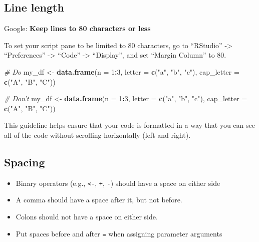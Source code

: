 \documentclass[]{book}
\makeatletter
\newenvironment{Shaded}{\begin{snugshade}}{\end{snugshade}}
\newcommand{\KeywordTok}[1]{\textcolor[rgb]{0.13,0.29,0.53}{\textbf{#1}}}
\newcommand{\DataTypeTok}[1]{\textcolor[rgb]{0.13,0.29,0.53}{#1}}
\newcommand{\DecValTok}[1]{\textcolor[rgb]{0.00,0.00,0.81}{#1}}
\newcommand{\StringTok}[1]{\textcolor[rgb]{0.31,0.60,0.02}{#1}}
\newcommand{\CommentTok}[1]{\textcolor[rgb]{0.56,0.35,0.01}{\textit{#1}}}
\newcommand{\OperatorTok}[1]{\textcolor[rgb]{0.81,0.36,0.00}{\textbf{#1}}}
\newcommand{\NormalTok}[1]{#1}
\providecommand{\tightlist}{%
  \setlength{\itemsep}{0pt}\setlength{\parskip}{0pt}}
\newenvironment{kframe}{%
\medskip{}
\setlength{\fboxsep}{.8em}
 \def\at@end@of@kframe{}%
 \ifinner\ifhmode%
  \def\at@end@of@kframe{\end{minipage}}%
  \begin{minipage}{\columnwidth}%
 \fi\fi%
 \def\FrameCommand##1{\hskip\@totalleftmargin \hskip-\fboxsep
 \colorbox{shadecolor}{##1}\hskip-\fboxsep
     \hskip-\linewidth \hskip-\@totalleftmargin \hskip\columnwidth}%
 \MakeFramed {\advance\hsize-\width
   \@totalleftmargin\z@ \linewidth\hsize
   \@setminipage}}%
 {\par\unskip\endMakeFramed%
 \at@end@of@kframe}
\renewenvironment{Shaded}{\begin{kframe}}{\end{kframe}}
\theoremstyle{definition}
\theoremstyle{definition}
\theoremstyle{definition}
\theoremstyle{remark}
\makeatother
\begin{document}
\subsection{Line length}\label{line-length}

Google: \textbf{Keep lines to 80 characters or less} \medskip

To set your script pane to be limited to 80 characters, go to
``RStudio'' -\textgreater{} ``Preferences'' -\textgreater{} ``Code''
-\textgreater{} ``Display'', and set ``Margin Column'' to 80.

\begin{Shaded}
\begin{Highlighting}[]
\CommentTok{# Do}
\NormalTok{my_df <-}\StringTok{ }\KeywordTok{data.frame}\NormalTok{(}\DataTypeTok{n =} \DecValTok{1}\OperatorTok{:}\DecValTok{3}\NormalTok{,}
                    \DataTypeTok{letter =} \KeywordTok{c}\NormalTok{(}\StringTok{"a"}\NormalTok{, }\StringTok{"b"}\NormalTok{, }\StringTok{"c"}\NormalTok{),}
                    \DataTypeTok{cap_letter =} \KeywordTok{c}\NormalTok{(}\StringTok{"A"}\NormalTok{, }\StringTok{"B"}\NormalTok{, }\StringTok{"C"}\NormalTok{))}

\CommentTok{# Don't}
\NormalTok{my_df <-}\StringTok{ }\KeywordTok{data.frame}\NormalTok{(}\DataTypeTok{n =} \DecValTok{1}\OperatorTok{:}\DecValTok{3}\NormalTok{, }\DataTypeTok{letter =} \KeywordTok{c}\NormalTok{(}\StringTok{"a"}\NormalTok{, }\StringTok{"b"}\NormalTok{, }\StringTok{"c"}\NormalTok{), }\DataTypeTok{cap_letter =} \KeywordTok{c}\NormalTok{(}\StringTok{"A"}\NormalTok{, }\StringTok{"B"}\NormalTok{, }\StringTok{"C"}\NormalTok{))}
\end{Highlighting}
\end{Shaded}

This guideline helps ensure that your code is formatted in a way that
you can see all of the code without scrolling horizontally (left and
right).

\subsection{Spacing}\label{spacing}

\begin{itemize}
\tightlist
\item
  Binary operators (e.g., \texttt{\textless{}-}, \texttt{+}, \texttt{-})
  should have a space on either side
\item
  A comma should have a space after it, but not before.
\item
  Colons should not have a space on either side.
\item
  Put spaces before and after \texttt{=} when assigning parameter
  arguments
\end{itemize}
\end{document}
